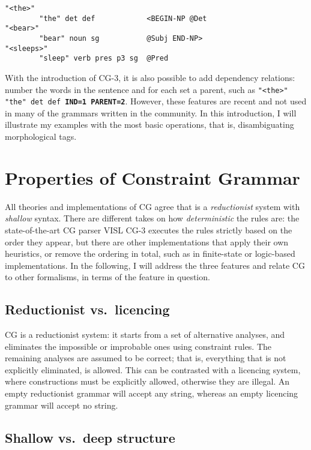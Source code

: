 \begin{verbatim}
"<the>"
        "the" det def            <BEGIN-NP @Det
"<bear>"
        "bear" noun sg           @Subj END-NP>
"<sleeps>"
        "sleep" verb pres p3 sg  @Pred

\end{verbatim}

With the introduction of CG-3, it is also possible to add dependency
relations: number the words in the sentence and for each set a parent,
such as \texttt{"<the>" "the" det def  \textbf{IND=1 PARENT=2}}. 
However, these features are recent and not used in many of the grammars written 
in the community. In this introduction, I will illustrate my examples with the 
most basic operations, that is, disambiguating morphological tags.


\section*{Properties of Constraint Grammar}\label{properties}

All theories and implementations of CG agree that is a \emph{reductionist}
system with \emph{shallow} syntax. There are different takes on how
\emph{deterministic} the rules are: the state-of-the-art CG parser VISL CG-3
executes the rules strictly based on the order they appear, but there
are other implementations that apply their own heuristics, or remove the
ordering in total, such as in finite-state or logic-based implementations. 
In the following, I will address the three features and relate CG to
other formalisms, in terms of the feature in question.

\subsection*{Reductionist vs.~licencing}\label{reductionist-vs.licencing}

CG is a reductionist system: it starts from a set of alternative
analyses, and eliminates the impossible or improbable ones using
constraint rules. The remaining analyses are assumed to be correct; that
is, everything that is not explicitly eliminated, is allowed. This can
be contrasted with a licencing system, where constructions must
be explicitly allowed, otherwise they are illegal. An empty
reductionist grammar will accept any string, whereas an empty
licencing grammar will accept no string.


\subsection*{Shallow vs.~deep structure}\label{shallow-vs.deep-structure}


